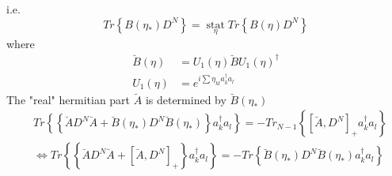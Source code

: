 \documentclass[aps,preprint]{revtex4}%
\begin{document}
i.e.%
\begin{equation}
Tr\left\{  B\left(  \eta_{\ast}\right)  D^{N}\right\}  =\operatorname*{stat}%
_{\eta}Tr\left\{  B\left(  \eta\right)  D^{N}\right\}
\end{equation}
where
\begin{align}
\breve{B}\left(  \eta\right)   &  =U_{1}\left(  \eta\right)  \breve{B}%
U_{1}\left(  \eta\right)  ^{\dagger}\nonumber\\
U_{1}\left(  \eta\right)   &  =e^{i%
{\textstyle\sum}
\eta_{kl}a_{k}^{\dagger}a_{l}}%
\end{align}
The "real" hermitian part $\breve{A}$ is determined by $\breve{B}\left(
\eta_{\ast}\right)  $
\begin{align}
&  Tr\left\{  \left\{  \breve{A}D^{N}\breve{A}+\breve{B}\left(  \eta_{\ast
}\right)  D^{N}\breve{B}\left(  \eta_{\ast}\right)  \right\}  a_{k}^{\dagger
}a_{l}\right\}  =-Tr_{N-1}\left\{  \left[  \breve{A},D^{N}\right]  _{+}%
a_{k}^{\dagger}a_{l}\right\}  \nonumber\\
&  \Leftrightarrow Tr\left\{  \left\{  \breve{A}D^{N}\breve{A}+\left[
\breve{A},D^{N}\right]  _{+}\right\}  a_{k}^{\dagger}a_{l}\right\}
=-Tr\left\{  \breve{B}\left(  \eta_{\ast}\right)  D^{N}\breve{B}\left(
\eta_{\ast}\right)  a_{k}^{\dagger}a_{l}\right\}  \label{con2}%
\end{align}
\end{document}

